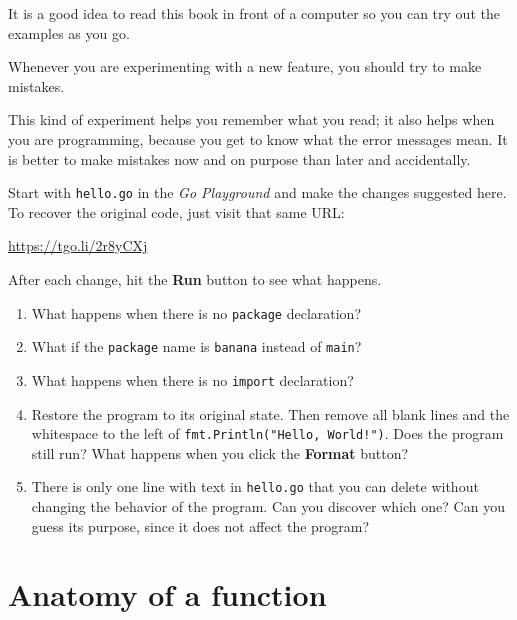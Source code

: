 \begin{exercise}

It is a good idea to read this book in front of a computer so you can try out
the examples as you go.

Whenever you are experimenting with a new feature, you should try to make
mistakes. 

This kind of experiment helps you remember what you read; it also
helps when you are programming, because you get to know what the error
messages mean. It is better to make mistakes now and on purpose than
later and accidentally.

Start with {\tt hello.go} in the {\it Go Playground} and make the changes
suggested here. To recover the original code, just visit that same URL:

\url{https://tgo.li/2r8yCXj}

After each change, hit the {\bf Run} button to see what happens.

\begin{enumerate}

\item What happens when there is no {\tt package} declaration?

\item What if the {\tt package} name is {\tt banana} instead of {\tt main}? 

\item What happens when there is no {\tt import} declaration?

\item Restore the program to its original state. Then remove all blank lines
and the whitespace to the left of {\tt fmt.Println("Hello, World!")}. Does the
program still run? What happens when you click the {\bf Format} button?

\item There is only one line with text in {\tt hello.go} that you can delete
without changing the behavior of the program. Can you discover which one?
Can you guess its purpose, since it does not affect the program?


\end{enumerate}

\end{exercise}


\section{Anatomy of a function}
\label{function!syntax}

